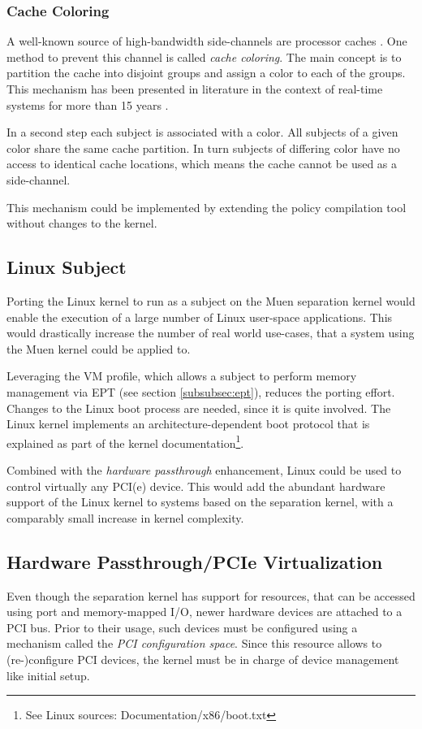 \subsubsection{Cache Coloring}
A well-known source of high-bandwidth side-channels are processor caches
\cite{cryptoeprint:2005:271}. One method to prevent this channel is called
\emph{cache coloring}. The main concept is to partition the cache into disjoint
groups and assign a color to each of the groups. This mechanism has been
presented in literature in the context of real-time systems for more than 15
years \cite{Liedtke:1997:OCP:523983.828369}
\cite{Mueller:1995:CSS:216633.216677}.

In a second step each subject is associated with a color. All subjects of a
given color share the same cache partition. In turn subjects of differing color
have no access to identical cache locations, which means the cache cannot be
used as a side-channel.

This mechanism could be implemented by extending the policy compilation tool
without changes to the kernel.

\subsection{Linux Subject}
Porting the Linux kernel to run as a subject on the Muen separation kernel would
enable the execution of a large number of Linux user-space applications. This
would drastically increase the number of real world use-cases, that a system
using the Muen kernel could be applied to.

Leveraging the VM profile, which allows a subject to perform memory management
via EPT (see section \ref{subsubsec:ept}), reduces the porting effort. Changes
to the Linux boot process are needed, since it is quite involved. The Linux
kernel implements an architecture-dependent boot protocol that is explained as
part of the kernel documentation\footnote{See Linux sources:
Documentation/x86/boot.txt}.

Combined with the \emph{hardware passthrough} enhancement, Linux could be used
to control virtually any PCI(e) device. This would add the abundant hardware
support of the Linux kernel to systems based on the separation kernel, with a
comparably small increase in kernel complexity.

\subsection{Hardware Passthrough/PCIe Virtualization}
Even though the separation kernel has support for resources, that can be
accessed using port and memory-mapped I/O, newer hardware devices are attached
to a PCI bus. Prior to their usage, such devices must be configured using a
mechanism called the \emph{PCI configuration space}. Since this resource allows
to (re-)configure PCI devices, the kernel must be in charge of device
management like initial setup.

